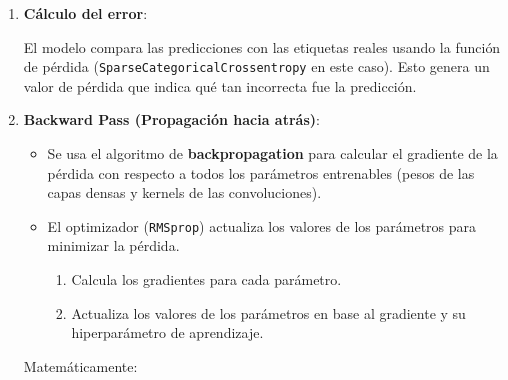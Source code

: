 \documentclass[../main.tex]{subfiles}
\begin{document}
\begin{itemize}
\begin{enumerate}
      \item \textbf{Cálculo del error}:

      El modelo compara las predicciones con las etiquetas reales usando la función de pérdida (\texttt{SparseCategoricalCrossentropy} en este caso). Esto genera un valor de pérdida que indica qué tan incorrecta fue la predicción.


      \item \textbf{Backward Pass (Propagación hacia atrás)}:

      \begin{itemize}
          \item Se usa el algoritmo de \textbf{backpropagation} para calcular el gradiente de la pérdida con respecto a todos los parámetros entrenables (pesos de las capas densas y kernels de las convoluciones).
          \item El optimizador (\texttt{RMSprop}) actualiza los valores de los parámetros para minimizar la pérdida.
          \begin{enumerate}
              \item Calcula los gradientes para cada parámetro.
              \item Actualiza los valores de los parámetros en base al gradiente y su hiperparámetro de aprendizaje.
          \end{enumerate}
      \end{itemize}

      Matemáticamente:


\end{enumerate}
\end{itemize}
\end{document}
